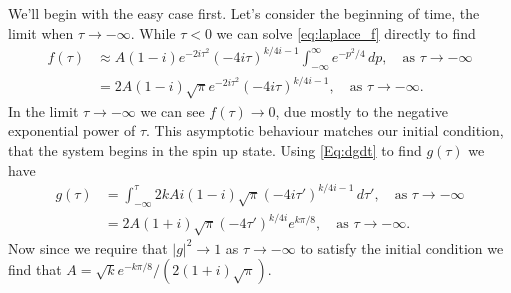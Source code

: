 We'll begin with the easy case first.
Let's consider the beginning of time, the limit when $\tau \to -\infty$.
While $\tau < 0$ we can solve \autoref{eq:laplace_f} directly to find
\begin{align}
	f(\tau) &\approx A\left(1-i\right)e^{-2i\tau^{2}}\left(-4i \tau\right)^{k/4i-1}\int_{-\infty}^{\infty}e^{-p^{2}/4}\, dp, \quad \text{as } \tau \to -\infty\\
	&= 2A\left(1-i\right)\sqrt{\pi}e^{-2i\tau^{2}}\left(-4i \tau\right)^{k/4i-1}, \quad \text{as } \tau \to -\infty.
\end{align}
In the limit $\tau \to -\infty$ we can see $f(\tau) \to 0$, due mostly to the negative exponential power of $\tau$.
This asymptotic behaviour matches our initial condition, that the system begins in the spin up state.
Using \autoref{Eq:dgdt} to find $g(\tau)$ we have 
\begin{align}
	g(\tau) &= \int_{-\infty}^{\tau}2kAi\left(1-i\right)\sqrt{\pi}\left(-4i \tau' \right)^{k/4i-1}\, d\tau', \quad \text{as } \tau \to -\infty\\
	&= 2A\left(1+i\right)\sqrt{\pi}\left(-4 \tau' \right)^{k/4i}e^{k\pi/8} , \quad \text{as } \tau \to -\infty.
\end{align}
Now since we require that $\left\vert g\right\vert^{2} \to 1$ as $\tau \to - \infty$ to satisfy the initial condition we find that $A = \sqrt{k}e^{-k\pi/8}/(2(1+i)\sqrt{\pi})$.

